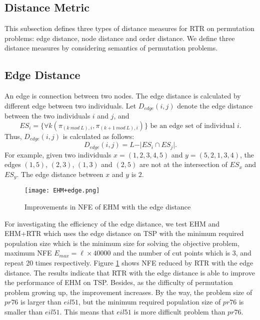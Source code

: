 \subsection{Distance Metric}

This subsection defines three types of distance measures for RTR on permutation problems: edge distance, node distance and order distance. We define three distance measures by considering semantics of permutation problems.
\subsection*{Edge Distance}


An edge is connection between two nodes. The edge distance is calculated by different edge between two individuals. Let $D_{edge} (i,j)$ denote the edge distance between the two individuals $i$ and $j$, and \[ES_i=\lbrace\forall k(\pi_{(k\ mod\ L),i}, \pi_{(k+1\ mod\ L),i})\rbrace\mbox{ be an edge set of individual }i.\] Thus, $D_{edge} (i,j)$ is calculated as follows:\[D_{edge} (i,j)=L-\vert ES_i\cap ES_j\vert.\] For example, given two individuals $x=(1,2,3,4,5)$ and $y=(5,2,1,3,4)$, the edges $(1,5)$, $(2,3)$, $(1,3)$ and $(2,5)$ are not at the intersection of $ES_x$ and $ES_y$. The edge distance between $x$ and $y$ is $2$. 


\begin{figure}[htbp] 
        \centering
        \texttt{[image: EHM+edge.png]}
        \caption{ Improvements in NFE of EHM with the edge distance } 
        \label{fig:ehbsa_imp}
\end{figure}

For investigating the efficiency of the edge distance, we test EHM and EHM+RTR which uses the edge distance on TSP with the minimum required population size which is the minimum size for solving the objective problem, maximum NFE $E_{max} = \ell\times 40000$ and the number of cut points which is 3, and repeat 20 times respectively. Figure \ref{fig:ehbsa_imp} shows NFE reduced by RTR with the edge distance. 
The results indicate that RTR with the edge distance is able to improve the performance of EHM on TSP. Besides, as the difficulty of permutation problem growing up, the improvement increases. By the way, the problem size of $pr76$ is larger than $eil51$, but the minimum required population size of $pr76$ is smaller than $eil51$. This means that $eil51$ is more difficult problem than $pr76$. 

